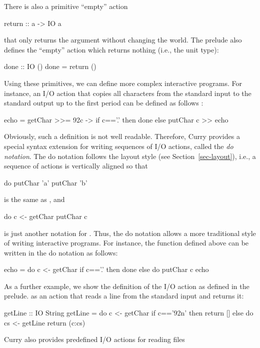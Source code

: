 There is also a primitive ``empty'' action
\begin{prog}
return :: a -> IO a
\end{prog}
that only returns the argument without changing the world.
The prelude also defines the ``empty'' action
which returns nothing (i.e., the unit type):
\begin{prog}
done :: IO ()
done = return ()
\end{prog}
%
Using these primitives, we can define more complex interactive programs.
For instance, an I/O action that copies all characters from
the standard input to the standard output up to the first period
can be defined as follows
:
\begin{prog}
echo = getChar >>= \char92c -> if c=='.' then done else putChar c >> echo
\end{prog}
%
Obviously, such a definition is not well readable.
Therefore, Curry provides a special syntax extension for
writing sequences of I/O actions, called the
\emph{do notation}.
The do notation follows the layout style
(see Section~\ref{sec-layout}), i.e., a sequence of actions
is vertically aligned so that
\begin{prog}
do putChar 'a'
   putChar 'b'
\end{prog}
is the same as , and
\begin{prog}
do c <- getChar
   putChar c
\end{prog}
is just another notation for .
Thus, the do notation allows a more traditional style of writing
interactive programs. For instance, the function 
defined above can be written in the do notation as follows:
\begin{prog}
echo = do c <- getChar
          if c=='.'
            then done
            else do putChar c
                    echo
\end{prog}
As a further example, we show the definition of the I/O action
 as defined in the prelude.
 as an action that reads a line from the standard input
and returns it:
\begin{prog}
getLine :: IO String
getLine = do c <- getChar
             if c=='\char92n'
                then return []
                else do cs <- getLine
                        return (c:cs)
\end{prog}
Curry also provides predefined I/O actions for reading files
